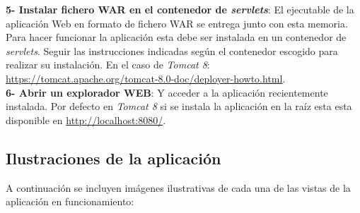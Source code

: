 \documentclass[11pt,a4paper]{article}
\begin{document}
\noindent\textbf{5- Instalar fichero WAR en el contenedor de \textit{servlets}}: El ejecutable de la aplicación Web en formato de fichero WAR se entrega junto con esta memoria. Para hacer funcionar la aplicación esta debe ser instalada en un contenedor de \textit{servlets}. Seguir las instrucciones indicadas según el contenedor escogido para realizar su instalación. En el caso de \textit{Tomcat 8}: \url{https://tomcat.apache.org/tomcat-8.0-doc/deployer-howto.html}.
\\

\noindent\textbf{6- Abrir un explorador WEB}: Y acceder a la aplicación recientemente instalada. Por defecto en \textit{Tomcat 8} si se instala la aplicación en la raíz esta esta disponible en \url{http://localhost:8080/}.

\newpage 

\subsection{Ilustraciones de la aplicación}\label{IlustracionApp} 
A continuación se incluyen imágenes ilustrativas de cada una de las vistas de la aplicación en funcionamiento:
\end{document}

